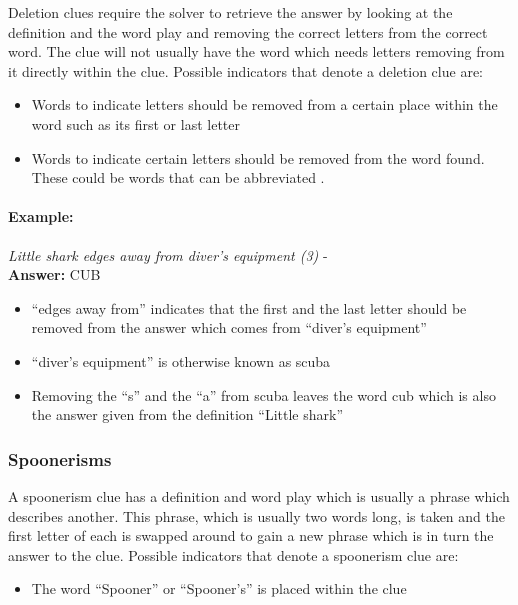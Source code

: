 Deletion clues require the solver to retrieve the answer by looking at the
definition and the word play and removing the correct letters from the correct
word. The clue will not usually have the word which needs letters removing from
it directly within the clue. Possible indicators that denote a deletion clue
are:

\begin{itemize}
  \item Words to indicate letters should be removed from a certain place 
        within the word such as its first or last letter 
  \item Words to indicate certain letters should be removed from the word 
        found. These could be words that can be abbreviated .
\end{itemize}

\paragraph{Example:} \emph{Little shark edges away from diver's equipment (3)} - \citep{shuchiDeletions09} \\
\textbf{Answer:} CUB 

\begin{itemize}
  \item ``edges away from'' indicates that the first and the last letter 
        should be removed from the answer which comes from ``diver’s equipment''
  \item ``diver’s equipment'' is otherwise known as scuba  
  \item Removing the ``s'' and the ``a'' from scuba leaves the word cub which
        is also the answer given from the definition ``Little shark''
\end{itemize}


\subsubsection{Spoonerisms}

A spoonerism clue has a definition and word play which is usually a phrase which
describes another. This phrase, which is usually two words long, is taken and
the first letter of each is swapped around to gain a new phrase which is in turn
the answer to the clue. Possible  indicators that denote a spoonerism clue are:

\begin{itemize} 
    \item The word ``Spooner'' or ``Spooner’s'' is placed within the clue
\end{itemize}


